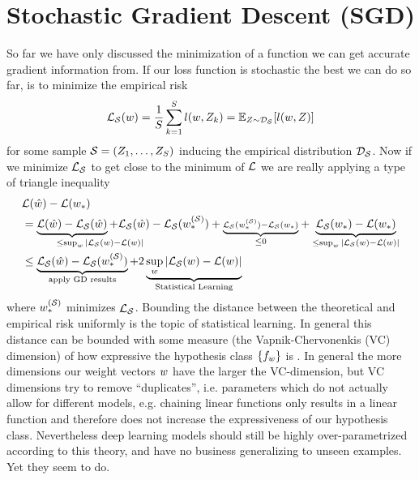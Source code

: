 
\chapter{Stochastic Gradient Descent (SGD)}\label{chap: sgd}

So far we have only discussed the minimization of a function we can get accurate
gradient information from. If our loss function is stochastic the best we can
do so far, is to minimize the empirical risk
\begin{align*}
	\mathcal{L}_{\mathcal{S}}(w) = \frac{1}{S}\sum_{k=1}^S l(w, Z_k)
	= \mathbb{E}_{Z\sim \mathcal{D}_{\mathcal{S}}}[l(w, Z)]
\end{align*}
for some sample \(\mathcal{S}=(Z_1,\dots,Z_S)\) inducing the empirical
distribution \(\mathcal{D}_{\mathcal{S}}\). Now if we minimize \(\mathcal{L}_{\mathcal{S}}\) to
get close to the minimum of \(\mathcal{L}\) we are really applying a type of triangle
inequality \parencite[e.g.][]{bottouOptimizationMethodsLargeScale2018}
\begin{align*}
	&\Loss(\hat{\weights}) - \Loss(\minimum)\\
	&=
	\underbrace{\Loss(\hat{\weights}) - \Loss_\sample(\hat{\weights})}_{
	\le \sup_{\weights}|\mathrlap{\Loss_\sample(\weights)-\Loss(\weights)|}
	}
	{
	+ \Loss_\sample(\hat{\weights}) - \Loss_\sample(\minimum^{(\sample)})
	+ \underbrace{
		\scriptstyle
		\Loss_\sample(\minimum^{(\sample)}) - \Loss_\sample(\minimum)
	}_{\le 0}
	}
	+ \underbrace{
		\Loss_\sample(\minimum)- \Loss(\minimum)
	}_{\le \sup_{\weights}|\Loss_\sample(\weights)-\Loss(\weights)|}
	\\
	&\le \underbrace{\Loss_\sample(\hat{\weights}) - \Loss_\sample(\minimum^{(\sample)})}_{
		\text{apply GD results}
	}
	+ 2\underbrace{\sup_{\weights}|\Loss_\sample(\weights)-\Loss(\weights)|}_{\text{Statistical Learning}}
\end{align*}
where \(w_*^{(\mathcal{S})}\) minimizes \(\mathcal{L}_{\mathcal{S}}\). Bounding the
distance between the theoretical and empirical risk uniformly is the topic
of statistical learning. In general this distance can be bounded with some
measure (the Vapnik-Chervonenkis (VC) dimension) of how expressive the
hypothesis class \(\{f_{w}\}\) is \parencite{vapnikOverviewStatisticalLearning1999}.
In general the more dimensions our weight vectors \(w\) have the larger
the VC-dimension, but VC dimensions try to remove ``duplicates'', i.e.
parameters which do not actually allow for different models, e.g. chaining
linear functions only results in a linear function and therefore does not
increase the expressiveness of our hypothesis class. Nevertheless deep learning
models should still be highly over-parametrized according to this theory, and
have no business generalizing to unseen examples. Yet they seem to do.

